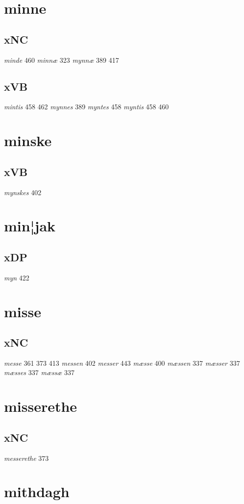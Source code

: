\documentclass[a4paper,twocolumn]{article}
\begin{document}
\section{minne}
\label{sec:orgeeabab4}
\subsection{xNC}
\label{sec:orgc0320a7}
\emph{minde} 460 \emph{minnæ} 323 \emph{mynnæ} 389 417 
\subsection{xVB}
\label{sec:org3a7afcb}
\emph{mintis} 458 462 \emph{mynnes} 389 \emph{myntes} 458 \emph{myntis} 458 460 
\section{minske}
\label{sec:org80786aa}
\subsection{xVB}
\label{sec:org139c691}
\emph{mynskes} 402 
\section{min¦jak}
\label{sec:org5368922}
\subsection{xDP}
\label{sec:org019f322}
\emph{myn} 422 
\section{misse}
\label{sec:org07797a9}
\subsection{xNC}
\label{sec:org8bc15a9}
\emph{messe} 361 373 413 \emph{messen} 402 \emph{messer} 443 \emph{mæsse} 400 \emph{mæssen} 337 \emph{mæsser} 337 \emph{mæsses} 337 \emph{mæssæ} 337 
\section{misserethe}
\label{sec:orgad66e8c}
\subsection{xNC}
\label{sec:orgace6931}
\emph{messerethe} 373 
\section{mithdagh}
\label{sec:org1d99891}
\end{document}
